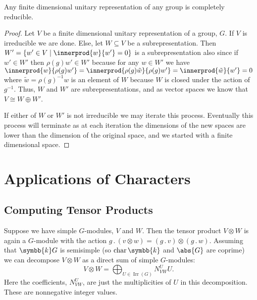 \documentclass[fleqn]{NotesClass}
\renewcommand{\field}{\symbb{k}}
\newcommand{\action}{\mathbin{.}}
\newcommand{\isomorphic}{\cong}
\DeclareMathOperator{\Irr}{Irr}
\DeclareMathOperator{\Char}{char}
\begin{document}
    \begin{thm}{}{}
        Any finite dimensional unitary representation of any group is completely reducible.
        \begin{proof}
            Let \(V\) be a finite dimensional unitary representation of a group, \(G\).
            If \(V\) is irreducible we are done.
            Else, let \(W \subseteq V\) be a subrepresentation.
            Then \(W' = \{w' \in V \mid \innerprod{w}{w'} = 0\}\) is a subrepresentation also since if \(w' \in W'\) then \(\rho(g)w' \in W'\) because for any \(w \in W'\) we have \(\innerprod{w}{\rho(g)w'} = \innerprod{\rho(g)\tilde{w}}{\rho(g)w'} = \innerprod{\tilde{w}}{w'} = 0\) where \(\tilde{w} = \rho(g)^{-1}w\) is an element of \(W\) because \(W\) is closed under the action of \(g^{-1}\).
            Thus, \(W\) and \(W'\) are subrepresentations, and as vector spaces we know that \(V \isomorphic W \oplus W'\).
            
            If either of \(W\) or \(W'\) is not irreducible we may iterate this process.
            Eventually this process will terminate as at each iteration the dimensions of the new spaces are lower than the dimension of the original space, and we started with a finite dimensional space.
        \end{proof}
    \end{thm}
    
    \chapter{Applications of Characters}
    \section{Computing Tensor Products}
    Suppose we have simple \(G\)-modules, \(V\) and \(W\).
    Then the tensor product \(V \otimes W\) is again a \(G\)-module with the action \(g \action (v \otimes w) = (g \action v) \otimes (g \action w)\).
    Assuming that \(\field G\) is semisimple (so \(\Char \field\) and \(\abs{G}\) are coprime) we can decompose \(V \otimes W\) as a direct sum of simple \(G\)-modules:
    \begin{equation}
        V \otimes W = \bigoplus_{U \in \Irr(G)} N^U_{VW} U.
    \end{equation}
    Here the coefficients, \(N^U_{VW}\), are just the multiplicities of \(U\) in this decomposition.
    These are nonnegative integer values.
    
\end{document}

